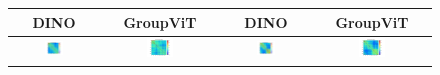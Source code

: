 \begin{figure}[thp]
  \centering
  
  \begin{tabular}{|cc|cc|}
   \toprule
    \textbf{\small DINO} & \textbf{\small GroupViT} & \textbf{\small DINO} & \textbf{\small GroupViT} \\
   \midrule
    \includegraphics[width=0.24\textwidth]{figures/cos_simmat_dino_0.png}\label{fig:f4} &
    \includegraphics[width=0.24\textwidth]{figures/cos_simmat_gvit_0.png}\label{fig:f4} &
    \includegraphics[width=0.24\textwidth]{figures/cos_simmat_dino_1.png} &
    \includegraphics[width=0.24\textwidth]{figures/cos_simmat_gvit_1.png}\label{fig:f4} \\
    
    \midrule
    

\end{tabular}
\end{figure}
